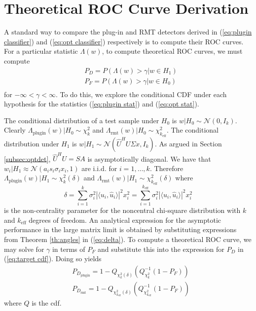 \section{Theoretical ROC Curve Derivation}\label{sec:roc}
A standard way to compare the plug-in and RMT detectors derived in (\ref{eq:plugin classifier}) and (\ref{eq:opt classifier}) respectively is to compute their ROC curves. For a particular statistic $\Lambda(w)$, to compute theoretical ROC curves, we must compute
\begin{equation}\label{eq:target cdf}
\begin{aligned}
&P_D = P(\Lambda(w) > \gamma| w\in H_1)\\
&P_F = P(\Lambda(w) > \gamma| w\in H_0)\\
\end{aligned}
\end{equation}
for $-\infty<\gamma<\infty$. To do this, we explore the conditional CDF under each hypothesis for the statistics (\ref{eq:plugin stat}) and (\ref{eq:opt stat}).

The conditional distribution of a test sample under $H_0$ is $w|H_0\sim\mathcal{N}(0,I_k)$. Clearly $\Lambda_\text{plugin}(w)|H_0\sim\chi_k^2$ and $\Lambda_\text{rmt}(w)|H_0\sim\chi_{k_\text{eff}}^2$. The conditional distribution under $H_1$ is $w|H_1\sim\mathcal{N}(\widehat{U}^HU\Sigma x,I_k)$. As argued in Section \ref{subsec:optdet}, $\widehat{U}^HU=SA$ is asymptotically diagonal. We have that $w_i|H_1\approx\mathcal{N}(a_is_i\sigma_ix_i,1)$ are i.i.d. for $i=1,\dots,k$. Therefore $\Lambda_\text{plugin}(w)|H_1\sim\chi_k^2(\delta)$ and $\Lambda_\text{rmt}(w)|H_1\sim\chi_{k_\text{eff}}^2(\delta)$ where
\begin{equation}\label{eq:delta}
\delta=\sum_{i=1}^k\sigma_i^2|\langle u_i,\widehat{u}_i\rangle|^2x_i^2=\sum_{i=1}^{k_\text{eff}}\sigma_i^2|\langle u_i,\widehat{u}_i\rangle|^2x_i^2
 \end{equation}
is the non-centrality parameter for the noncentral chi-square distribution with $k$ and $k_\text{eff}$ degrees of freedom. An analytical expression for the asymptotic performance in the large matrix limit  is obtained by substituting expressions from Theorem \ref{th:angles} in (\ref{eq:delta}). To compute a theoretical ROC curve, we may solve for $\gamma$ in terms of $P_F$ and substitute this into the expression for $P_D$  in (\ref{eq:target cdf}). Doing so yields
\begin{equation}\label{eq:roc}
\begin{aligned}
&P_{D_\text{plugin}}=1-Q_{\chi_k^2(\delta)}\left(Q^{-1}_{\chi^2_k}\left(1-P_F\right)\right)\\
&P_{D_\text{rmt}}=1-Q_{\chi_{k_\text{eff}}^2(\delta)}\left(Q^{-1}_{\chi^2_{k_\text{eff}}}\left(1-P_F\right)\right)
\end{aligned}
\end{equation}
where $Q$ is the cdf.

